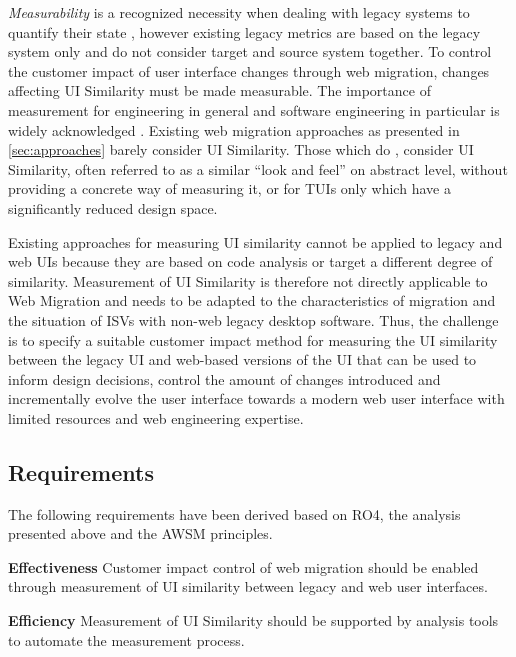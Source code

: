 \emph{Measurability} is a recognized necessity when dealing with legacy systems to quantify their state \autocite{Masak2006}, however existing legacy metrics are based on the legacy system only and do not consider target and source system together.
To control the customer impact of user interface changes through web migration, changes affecting UI Similarity must be made measurable.
The importance of measurement for engineering in general and software engineering in particular is widely acknowledged \autocite{SWEBOK2014}.
Existing web migration approaches as presented in \cref{sec:approaches} barely consider UI Similarity.
Those which do \autocite{Remics2013RecoverToolkit,Rodriguez-Echeverria2012MIGRARIA,Lucia2008,Distante2006a,Lucia2006,Distante2002}, consider UI Similarity, often referred to as a similar ``look and feel'' \autocite{Rodriguez-Echeverria2012MIGRARIA,Lucia2008,Lucia2006} on abstract level, without providing a concrete way of measuring it, or for TUIs only \autocite{Bodhuin2002DesktopWebMVC} which have a significantly reduced design space.

Existing approaches for measuring UI similarity cannot be applied to legacy and web UIs because they are based on code analysis or target a different degree of similarity.
Measurement of UI Similarity is therefore not directly applicable to Web Migration and needs to be adapted to the characteristics of migration and the situation of ISVs with non-web legacy desktop software.
Thus, the challenge is to specify a suitable customer impact method for measuring the UI similarity between the legacy UI and web-based versions of the UI that can be used to inform design decisions, control the amount of changes introduced and incrementally evolve the user interface towards a modern web user interface with limited resources and web engineering expertise.

\hypertarget{sec:ci.requirements}{%
\subsection{Requirements}\label{sec:ci.requirements}}

The following requirements have been derived based on RO4, the analysis presented above and the AWSM principles.

\textbf{Effectiveness} Customer impact control of web migration should be enabled through measurement of UI similarity between legacy and web user interfaces.

\textbf{Efficiency} Measurement of UI Similarity should be supported by analysis tools to automate the measurement process.

